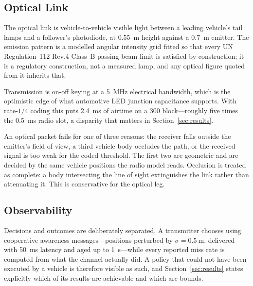 \subsection{Optical Link}
\label{sec:sys:vlc}

The optical link is vehicle-to-vehicle visible light between a leading
vehicle's tail lamps and a follower's photodiode, at \SI{0.55}{\metre} height
against a \SI{0.7}{\metre} emitter. The emission pattern is a modelled angular
intensity grid fitted so that every UN Regulation~112 Rev.4 Class~B
passing-beam limit is satisfied by construction; it is a regulatory
construction, not a measured lamp, and any optical figure quoted from it
inherits that.

Transmission is on-off keying at a \SI{5}{\mega\hertz} electrical bandwidth,
which is the optimistic edge of what automotive LED junction capacitance
supports. With rate-$1/4$ coding this puts \SI{2.4}{\milli\second} of airtime
on a \SI{300}{\byte} block---roughly five times the \SI{0.5}{\milli\second}
radio slot, a disparity that matters in Section~\ref{sec:results}.

An optical packet fails for one of three reasons: the receiver falls outside
the emitter's field of view, a third vehicle body occludes the path, or the
received signal is too weak for the coded threshold. The first two are
geometric and are decided by the same vehicle positions the radio model reads.
Occlusion is treated as complete: a body intersecting the line of sight
extinguishes the link rather than attenuating it. This is conservative for the
optical leg.

\subsection{Observability}
\label{sec:sys:obs}

Decisions and outcomes are deliberately separated. A transmitter chooses using
cooperative awareness messages---positions perturbed by
$\sigma = \SI{0.5}{\metre}$, delivered with \SI{50}{\milli\second} latency and
aged up to \SI{1}{\second}---while every reported miss rate is computed from
what the channel actually did. A policy that could not have been executed by a
vehicle is therefore visible as such, and Section~\ref{sec:results} states
explicitly which of its results are achievable and which are bounds.


